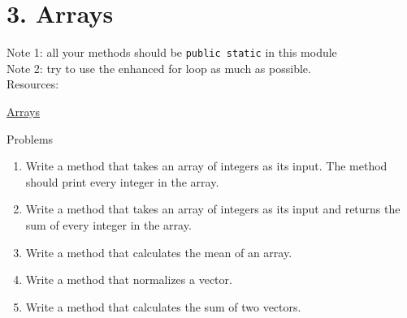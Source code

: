 \documentclass[12pt,letterpaper]{article}
\newcommand\hwnumber{3}
\begin{document}
\section*{\hwnumber. Arrays}
Note 1: all your methods should be \lstinline{public static} in this module \\
Note 2: try to use the enhanced for loop as much as possible. \\
Resources:
\begin{description}
    \item \href{ https://www.webucator.com/tutorial/learn-java/arrays.cfm}{Arrays}
\end{description}


Problems
\begin{enumerate}
\item
Write a method that takes an array of integers as its input. The method should print every integer in the array.

\item
Write a method that takes an array of integers as its input and returns the sum of every integer in the array.

\item
Write a method that calculates the mean of an array.

\item
Write a method that normalizes a vector.

\item
Write a method that calculates the sum of two vectors.


\end{enumerate}
\end{document}
